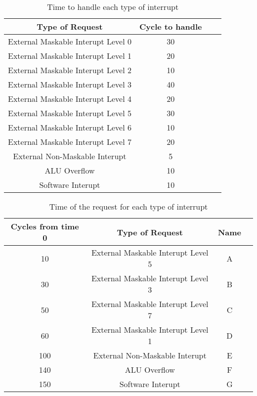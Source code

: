 \begin{table}[H]
    \centering
    \begin{tabular}{|c|c|c|c|}
        \hline
        Type of Request & Cycle to handle \\ \hline
        External Maskable Interupt Level 0 & 30 \\ \hline
        External Maskable Interupt Level 1 & 20 \\ \hline
        External Maskable Interupt Level 2 & 10 \\ \hline
        External Maskable Interupt Level 3 & 40 \\ \hline
        External Maskable Interupt Level 4 & 20 \\ \hline
        External Maskable Interupt Level 5 & 30 \\ \hline
        External Maskable Interupt Level 6 & 10 \\ \hline
        External Maskable Interupt Level 7 & 20 \\ \hline
        External Non-Maskable Interupt & 5 \\ \hline
        ALU Overflow & 10 \\ \hline
        Software Interupt & 10 \\ \hline
    \end{tabular}
    \caption{Time to handle each type of interrupt}
\end{table}


\begin{table}[H]
    \centering
    \begin{tabular}{|c|c|c|c|}
        \hline
        Cycles from time 0 & Type of Request & Name \\ \hline
        10 & External Maskable Interupt Level 5 & A \\ \hline
        30 & External Maskable Interupt Level 3 & B \\ \hline
        50 & External Maskable Interupt Level 7 & C \\ \hline
        60 & External Maskable Interupt Level 1 & D \\ \hline
        100 & External Non-Maskable Interupt & E \\ \hline
        140 & ALU Overflow & F \\ \hline
        150 & Software Interupt & G \\ \hline
    \end{tabular}
    \caption{Time of the request for each type of interrupt}
\end{table}

